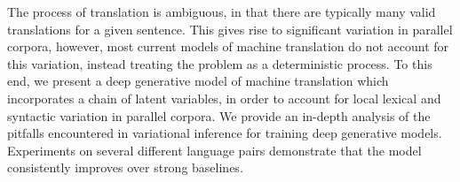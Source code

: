 The process of translation is ambiguous, in that there are typically many valid translations for a given sentence. This gives rise to significant variation in parallel corpora, however, most current models of machine translation do not account for this variation, instead treating the problem as a deterministic process. To this end, we present a deep generative model of machine translation which incorporates a chain of latent variables, in order to account for local lexical and syntactic variation in parallel corpora. We provide an in-depth analysis of the pitfalls encountered in variational inference for training deep generative models.  Experiments on several different language pairs demonstrate that the model consistently improves over strong baselines.

